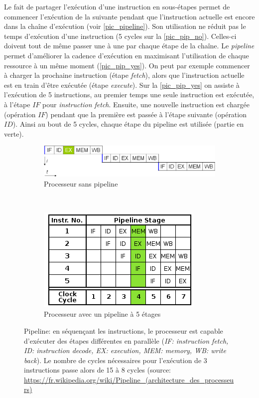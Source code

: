 Le fait de partager l'exécution d'une instruction en sous-étapes permet de commencer l'exécution de la suivante pendant que l'instruction actuelle est encore dans la chaîne d'exécution (voir \autoref{pic_pipeline}). Son utilisation ne réduit pas le temps d'exécution d'une instruction (5 cycles sur la \autoref{pic_pip_no}). Celles-ci doivent tout de même passer une à une par chaque étape de la chaîne. Le \textit{pipeline} permet d'améliorer la cadence d'exécution en maximisant l'utilisation de chaque ressource à un même moment (\autoref{pic_pip_yes}). On peut par exemple commencer à charger la prochaine instruction (étape \textit{fetch}), alors que l'instruction actuelle est en train d'être exécutée (étape \textit{execute}). Sur la \autoref{pic_pip_yes} on assiste à l'exécution de 5 instructions, au premier temps une seule instruction est exécutée, à l'étape $IF$ pour \textit{instruction fetch}. Ensuite, une nouvelle instruction est chargée (opération $IF$) pendant que la première est passée à l'étape suivante (opération $ID$). Ainsi au bout de 5 cycles, chaque étape du pipeline est utilisée (partie en verte). 


\begin{figure}
    \begin{subfigure}[]{0.5\linewidth}\centering
        \vspace{1.6cm}
        \includegraphics[width=\linewidth]{images/Chapitre1/pipelineNo.png}
        \caption{Processeur sans pipeline \label{pic_pip_no}}
    \end{subfigure}%
    ~ %
    \begin{subfigure}[]{0.5\linewidth}\centering
        \includegraphics[width=.7\linewidth]{images/Chapitre1/pipelineYes.png}
        \caption{Processeur avec un pipeline à 5 étages \label{pic_pip_yes}}
    \end{subfigure}
    
    \caption{Pipeline: en séquençant les instructions, le processeur est capable d'exécuter des étapes différentes en parallèle (\textit{IF: instruction fetch, ID: instruction decode, EX: execution, MEM: memory, WB: write back}). Le nombre de cycles nécessaires pour l'exécution de 3 instructions passe alors de 15 à 8 cycles (source: \url{https://fr.wikipedia.org/wiki/Pipeline_(architecture_des_processeurs)} }
    \label{pic_pipeline}
\end{figure}




